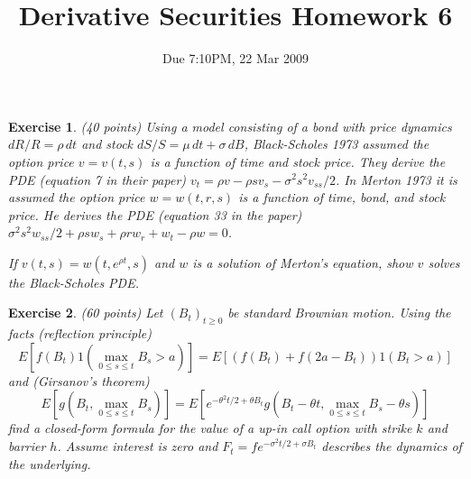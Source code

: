 \documentclass[11pt,fleqn]{amsproc}
\newtheorem{xca}{Exercise}
\begin{document}
\title{Derivative Securities Homework 6}
\author{Due 7:10PM, 22 Mar 2009}

\maketitle

\begin{xca}{(40 points)}
Using a model consisting of a bond with price dynamics
$dR/R = \rho\,dt$ and stock $dS/S = \mu\,dt + \sigma\,dB$,
Black-Scholes 1973 assumed the option price $v = v(t, s)$
is a function of time and stock price.
They derive the PDE (equation 7 in their paper)
$v_t = \rho v - \rho sv_s - \sigma^2 s^2 v_{ss}/2$. In Merton 1973
it is assumed the option price $w = w(t, r, s)$ is a function
of time, bond, and stock price. He derives the PDE (equation 33
in the paper)
$\sigma^2 s^2 w_{ss}/2 + \rho sw_s + \rho r w_r + w_t - \rho w = 0$.

If $v(t, s) = w(t, e^{\rho t}, s)$ and $w$ is a solution of
Merton's equation, show $v$ solves the Black-Scholes PDE.
\end{xca}


\begin{xca}{(60 points)}
Let $(B_t)_{t\ge0}$ be standard Brownian motion. Using the
facts (reflection principle)
\begin{equation*}
E[f(B_t)1(\max_{0\le s\le t}B_s > a)]
= E[(f(B_t) + f(2a - B_t))1(B_t > a)]
\end{equation*}
and (Girsanov's theorem)
\begin{equation*}
E[g(B_t, \max_{0\le s\le t}B_s)]
= E[e^{-\theta^2 t/2 + \theta B_t}
g(B_t - \theta t, \max_{0\le s\le t}B_s - \theta s)]
\end{equation*}
find a closed-form formula for the value of a up-in call option
with strike $k$ and barrier $h$.
Assume interest is zero and
$F_t = fe^{-\sigma^2 t/2 + \sigma B_t}$ describes the
dynamics of the underlying.
\end{xca}
\end{document}
